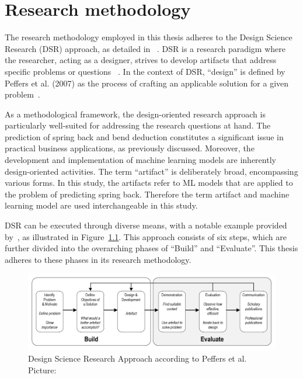 \chapter{Research methodology}\label{ch:research-methodology}

The research methodology employed in this thesis adheres to the Design Science Research (DSR) approach, as detailed
in
~\cite[p. 17]{rennenkampff_managementitagilitaetentwicklung_2015}.
DSR is a research paradigm where the researcher, acting as a designer, strives to develop artifacts that address
specific problems or questions
~\cite[p. 10]{hevner_designscienceresearch_2010}.
In the context of DSR, ``design'' is defined by Peffers et al. (2007) as the process of crafting an applicable solution
for a given problem~\cite[p. 47]{peffers_designscienceresearch_2007}.

As a methodological framework, the design-oriented research approach is particularly well-suited for addressing the
research questions at hand.
The prediction of spring back and bend deduction constitutes a significant issue in practical business applications,
as previously discussed.
Moreover, the development and implementation of machine learning models are inherently design-oriented activities.
The term ``artifact'' is deliberately broad, encompassing various forms.
In this study, the artifacts refer to \ac{ML} models that are applied to the problem of predicting spring back.
Therefore the term artifact and machine learning model are used interchangeable in this study.

DSR can be executed through diverse means, with a notable example provided by~\cite{peffers_designscienceresearch_2007},
as illustrated in Figure~\ref{fig:dsr_process}.
This approach consists of six steps, which are further divided into the overarching phases of ``Build'' and
``Evaluate''.
This thesis adheres to these phases in its research methodology.

\begin{figure}[h]
    \begin{tcolorbox}[arc=0pt,boxrule=0.5pt]
        \centering
        \includegraphics[width=1\linewidth]{chap3/images/dsr_process}
        \caption[DSR Process]{Design Science Research Approach according to Peffers et al.
        Picture:~\cite[p. 72]{sonnenberg_evaluationpatternsdesign_2012}}
        \label{fig:dsr_process}
    \end{tcolorbox}
\end{figure}

